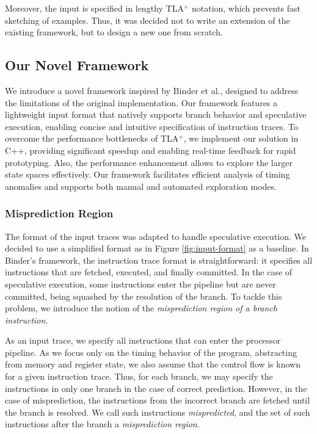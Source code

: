 Moreover, the input is specified in lengthy TLA$^+$ notation, which prevents fast sketching of examples. Thus, it was decided not to write an extension of the existing framework, but to design a new one from scratch.

\subsection{Our Novel Framework}

We introduce a novel framework inspired by Binder et al., designed to address the limitations of the original implementation. Our framework features a lightweight input format that natively supports branch behavior and speculative execution, enabling concise and intuitive specification of instruction traces. To overcome the performance bottlenecks of TLA$^+$, we implement our solution in C++, providing significant speedup and enabling real-time feedback for rapid prototyping. Also, the performance enhancement allows to explore the larger state spaces effectively. Our framework facilitates efficient analysis of timing anomalies and supports both manual and automated exploration modes.

\subsubsection{Misprediction Region}

The format of the input traces was adapted to handle speculative execution. We decided to use a simplified format as in Figure \ref{fig:input-format} as a baseline. In Binder's framework, the instruction trace format is straightforward: it specifies all instructions that are fetched, executed, and finally committed. In the case of speculative execution, some instructions enter the pipeline but are never committed, being squashed by the resolution of the branch. To tackle this problem, we introduce the notion of the \textit{misprediction region of a branch instruction}.

As an input trace, we specify all instructions that can enter the processor pipeline. As we focus only on the timing behavior of the program, abstracting from memory and register state, we also assume that the control flow is known for a given instruction trace. Thus, for each branch, we may specify the instructions in only one branch in the case of correct prediction. However, in the case of misprediction, the instructions from the incorrect branch are fetched until the branch is resolved. We call such instructions \textit{mispredicted}, and the set of such instructions after the branch a \textit{misprediction region}. 

